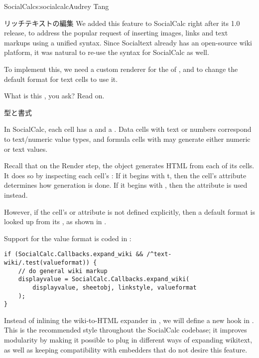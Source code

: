 \begin{aosachapter}{SocialCalc}{s:socialcalc}{Audrey Tang}
\begin{aosasect1}{リッチテキストの編集}
We added this feature to SocialCalc right after its 1.0 release, to
address the popular request of inserting images, links and text
markups using a unified syntax.  Since Socialtext already has an
open-source wiki platform, it was natural to re-use the syntax for
SocialCalc as well.

To implement this, we need a custom renderer for the
 of , and to change the default
format for text cells to use it.

What is this , you ask?  Read on.

\begin{aosasect2}{型と書式}

In SocialCalc, each cell has a  and a .
Data cells with text or numbers correspond to text/numeric value
types, and formula cells with  may generate either
numeric or text values.

Recall that on the Render step, the  object generates HTML
from each of its cells.  It does so by inspecting each cell's
: If it begins with t, then the cell's
 attribute determines how generation is done.
If it begins with , then the  attribute is
used instead.

However, if the cell's  or
 attribute is not defined explicitly, then a
default format is looked up from its , as shown in
.



\noindent Support for the  value format is coded in
:

\begin{verbatim}
if (SocialCalc.Callbacks.expand_wiki && /^text-wiki/.test(valueformat)) {
    // do general wiki markup
    displayvalue = SocialCalc.Callbacks.expand_wiki(
        displayvalue, sheetobj, linkstyle, valueformat
    );
}
\end{verbatim}

Instead of inlining the wiki-to-HTML expander in
, we will define a new hook in
.  This is the recommended style
throughout the SocialCalc codebase; it improves modularity by making
it possible to plug in different ways of expanding wikitext, as well
as keeping compatibility with embedders that do not desire this
feature.


\end{aosasect2}
\end{aosasect1}
\end{aosachapter}
